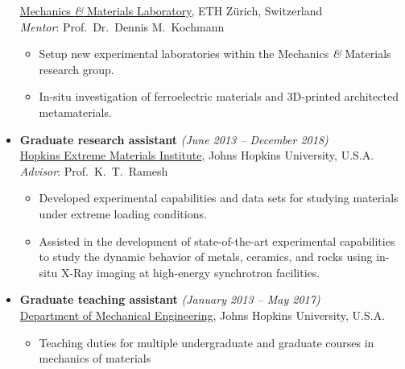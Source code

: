 \documentclass[a4paper,10pt, oneside]{article}
\begin{document}
\begin{itemize}[wide, labelwidth=!, labelindent=-1em]
		\href{https://mm.ethz.ch/}{Mechanics \emph{\&} Materials Laboratory}, ETH Z\"{u}rich, Switzerland \\
		\textit{Mentor}: Prof.~Dr.~Dennis M.~Kochmann
		\begin{itemize}[wide, labelwidth=!, labelindent=0em]
			\item Setup new experimental laboratories within the Mechanics \emph{\&} Materials research group.
			\item In-situ investigation of ferroelectric materials and 3D-printed architected metamaterials.		
		\end{itemize}
		\vspace*{0.5em}
		\item[]\textbf{Graduate research assistant} \hfill \textit{(June 2013 -- December 2018)}\\
		\href{https://hemi.jhu.edu/}{Hopkins Extreme Materials Institute}, Johns Hopkins University, U.S.A. \\
		\textit{Advisor}: Prof.~K.~T.~Ramesh
		\begin{itemize}[wide, labelwidth=!, labelindent=0em]
			\item Developed experimental capabilities and data sets for studying materials under extreme loading conditions.
			\item Assisted in the development of state-of-the-art experimental capabilities to study the dynamic behavior of metals, ceramics, and rocks using in-situ X-Ray imaging at high-energy synchrotron facilities.
		\end{itemize}
		\vspace*{0.5em}
		\item[]\textbf{Graduate teaching assistant} \hfill \textit{(January 2013  -- May 2017)} \\
		\href{https://me.jhu.edu/}{Department of Mechanical Engineering}, Johns Hopkins University, U.S.A.
		\begin{itemize}[wide, labelwidth=!, labelindent=0em]
			\item Teaching duties for multiple undergraduate and graduate courses in mechanics of materials
		\end{itemize} 
	\end{itemize}
	
\end{document}
